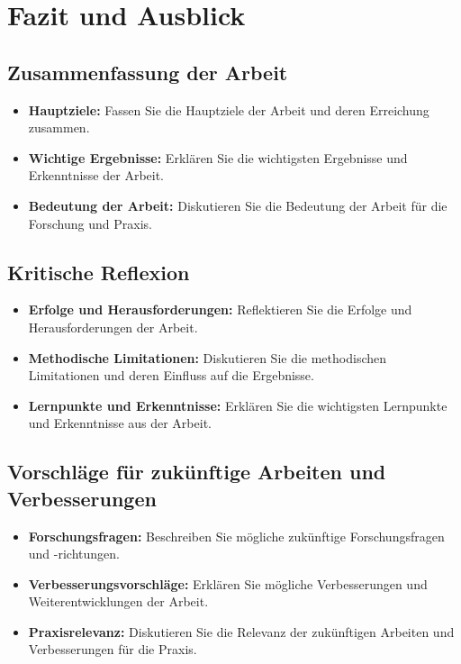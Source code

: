 \chapter{Fazit und Ausblick}

\section{Zusammenfassung der Arbeit}
\begin{itemize}
    \item \textbf{Hauptziele:} Fassen Sie die Hauptziele der Arbeit und deren Erreichung zusammen.
    \item \textbf{Wichtige Ergebnisse:} Erklären Sie die wichtigsten Ergebnisse und Erkenntnisse der Arbeit.
    \item \textbf{Bedeutung der Arbeit:} Diskutieren Sie die Bedeutung der Arbeit für die Forschung und Praxis.
\end{itemize}

\section{Kritische Reflexion}
\begin{itemize}
    \item \textbf{Erfolge und Herausforderungen:} Reflektieren Sie die Erfolge und Herausforderungen der Arbeit.
    \item \textbf{Methodische Limitationen:} Diskutieren Sie die methodischen Limitationen und deren Einfluss auf die Ergebnisse.
    \item \textbf{Lernpunkte und Erkenntnisse:} Erklären Sie die wichtigsten Lernpunkte und Erkenntnisse aus der Arbeit.
\end{itemize}

\section{Vorschläge für zukünftige Arbeiten und Verbesserungen}
\begin{itemize}
    \item \textbf{Forschungsfragen:} Beschreiben Sie mögliche zukünftige Forschungsfragen und -richtungen.
    \item \textbf{Verbesserungsvorschläge:} Erklären Sie mögliche Verbesserungen und Weiterentwicklungen der Arbeit.
    \item \textbf{Praxisrelevanz:} Diskutieren Sie die Relevanz der zukünftigen Arbeiten und Verbesserungen für die Praxis.
\end{itemize}
